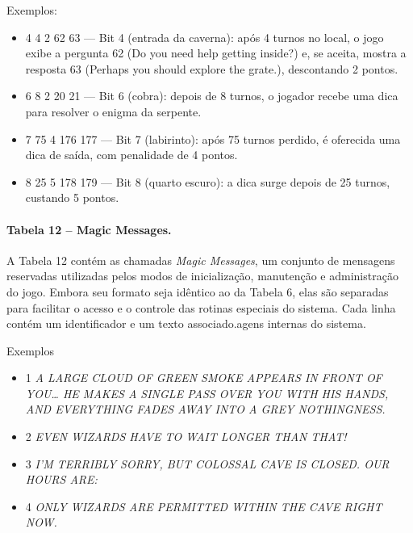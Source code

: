 \documentclass[12pt,a4paper]{article}
\begin{document}
Exemplos:
\begin{itemize}
  \item 4 4 2 62 63 — Bit 4 (entrada da caverna): após 4 turnos no local, o jogo exibe a pergunta 62 (Do you need help getting inside?) e, se aceita, mostra a resposta 63 (Perhaps you should explore the grate.), descontando 2 pontos.
  \item 6 8 2 20 21 — Bit 6 (cobra): depois de 8 turnos, o jogador recebe uma dica para resolver o enigma da serpente.
  \item 7 75 4 176 177 — Bit 7 (labirinto): após 75 turnos perdido, é oferecida uma dica de saída, com penalidade de 4 pontos.
  \item 8 25 5 178 179 — Bit 8 (quarto escuro): a dica surge depois de 25 turnos, custando 5 pontos.
\end{itemize}

\paragraph{Tabela 12 – Magic Messages.}
A Tabela 12 contém as chamadas \textit{Magic Messages}, um conjunto de mensagens reservadas utilizadas pelos modos de inicialização, manutenção e administração do jogo.  
Embora seu formato seja idêntico ao da Tabela 6, elas são separadas para facilitar o acesso e o controle das rotinas especiais do sistema. Cada linha contém um identificador e um texto associado.agens internas do sistema.

Exemplos
\begin{itemize}
  \item 1 \textit{A LARGE CLOUD OF GREEN SMOKE APPEARS IN FRONT OF YOU… HE MAKES A SINGLE PASS OVER YOU WITH HIS HANDS, AND EVERYTHING FADES AWAY INTO A GREY NOTHINGNESS.}
  \item 2 \textit{EVEN WIZARDS HAVE TO WAIT LONGER THAN THAT!}
  \item 3 \textit{I'M TERRIBLY SORRY, BUT COLOSSAL CAVE IS CLOSED. OUR HOURS ARE:}
  \item 4 \textit{ONLY WIZARDS ARE PERMITTED WITHIN THE CAVE RIGHT NOW.}
\end{itemize}

\newpage

\printbibliography
\end{document}
